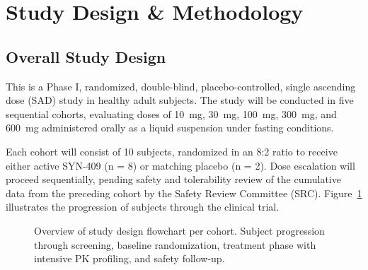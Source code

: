 \section{Study Design \& Methodology}
\label{sec:methodology}

\subsection{Overall Study Design}

This is a Phase I, randomized, double-blind, placebo-controlled, single ascending dose (SAD) study in healthy adult subjects. The study will be conducted in five sequential cohorts, evaluating doses of 10~mg, 30~mg, 100~mg, 300~mg, and 600~mg administered orally as a liquid suspension under fasting conditions. 

Each cohort will consist of 10 subjects, randomized in an 8:2 ratio to receive either active SYN-409 (n = 8) or matching placebo (n = 2). Dose escalation will proceed sequentially, pending safety and tolerability review of the cumulative data from the preceding cohort by the Safety Review Committee (SRC). Figure~\ref{fig:study_flow} illustrates the progression of subjects through the clinical trial.

\begin{figure}[H]
\centering
{}
\caption{Overview of study design flowchart per cohort. Subject progression through screening, baseline randomization, treatment phase with intensive PK profiling, and safety follow-up.}
\label{fig:study_flow}
\end{figure}

